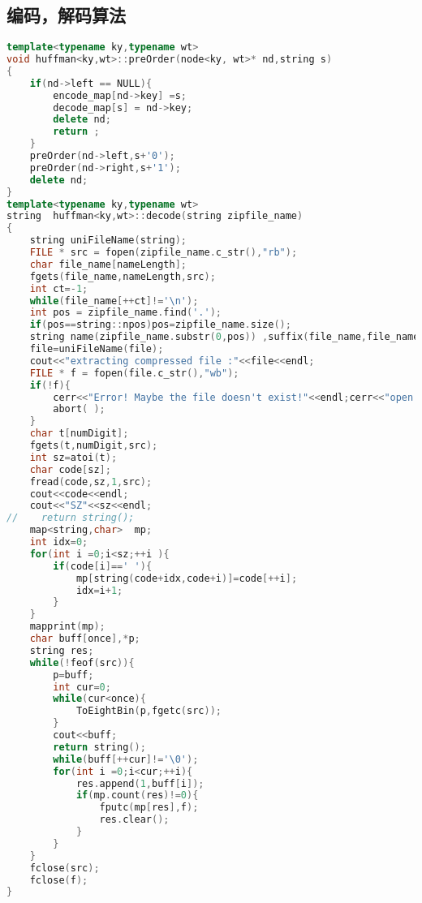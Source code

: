 \documentclass[UTF8]{ctexart}
\begin{document}
\subsection{编码，解码算法}
\begin{lstlisting}[language=c++]
template<typename ky,typename wt>
void huffman<ky,wt>::preOrder(node<ky, wt>* nd,string s)
{
    if(nd->left == NULL){
        encode_map[nd->key] =s;
        decode_map[s] = nd->key;
        delete nd;
        return ;
    }
    preOrder(nd->left,s+'0');
    preOrder(nd->right,s+'1');
    delete nd;
}
template<typename ky,typename wt>
string  huffman<ky,wt>::decode(string zipfile_name)
{
    string uniFileName(string);
    FILE * src = fopen(zipfile_name.c_str(),"rb");
    char file_name[nameLength];
    fgets(file_name,nameLength,src);
    int ct=-1;
    while(file_name[++ct]!='\n');
    int pos = zipfile_name.find('.');
    if(pos==string::npos)pos=zipfile_name.size();
    string name(zipfile_name.substr(0,pos)) ,suffix(file_name,file_name+ct),file(name+suffix);
    file=uniFileName(file);
    cout<<"extracting compressed file :"<<file<<endl;
    FILE * f = fopen(file.c_str(),"wb");
    if(!f){
        cerr<<"Error! Maybe the file doesn't exist!"<<endl;cerr<<"open error!"<<endl;
        abort( );
    }
    char t[numDigit];
    fgets(t,numDigit,src);
    int sz=atoi(t);
    char code[sz];
    fread(code,sz,1,src);
    cout<<code<<endl;
    cout<<"SZ"<<sz<<endl;
//    return string();
    map<string,char>  mp;
    int idx=0;
    for(int i =0;i<sz;++i ){
        if(code[i]==' '){
            mp[string(code+idx,code+i)]=code[++i];
            idx=i+1;
        }
    }
    mapprint(mp);
    char buff[once],*p;
    string res;
    while(!feof(src)){
        p=buff;
        int cur=0;
        while(cur<once){
            ToEightBin(p,fgetc(src));
        }
        cout<<buff;
        return string();
        while(buff[++cur]!='\0');
        for(int i =0;i<cur;++i){
            res.append(1,buff[i]);
            if(mp.count(res)!=0){
                fputc(mp[res],f);
                res.clear();
            }
        }
    }
    fclose(src);
    fclose(f);
}


\end{lstlisting}
\end{document}
